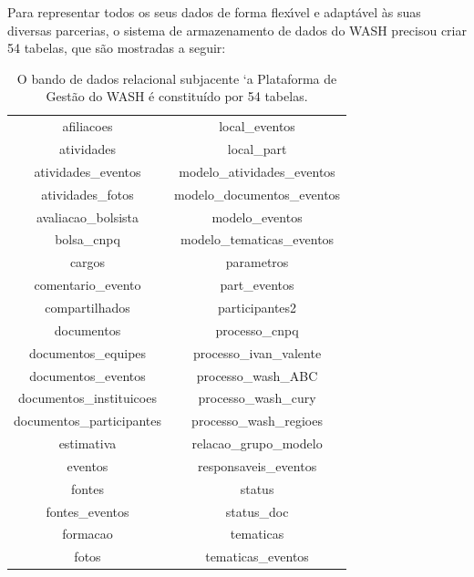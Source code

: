 \documentclass[
12pt,		%
openright,	%
twoside,  %
a4paper,			%
chapter=TITLE,		%
english,			%
french,				%
spanish,			%
brazil				%
]{USPSC-classe/USPSC}
\begin{document}
Para representar todos os seus dados de forma flex\'{\i}vel e adapt\'avel \`as suas diversas parcerias, o sistema de armazenamento de dados do WASH precisou criar 54 tabelas, que s\~ao mostradas a seguir:






\begin{table}[htb]
\tiny
\caption{\label{5b2e4ba8f3836249e7dd88b37344da7bfa3669c5}O bando de dados relacional subjacente `a Plataforma de Gest\~ao do WASH \'e constitu\'{i}do por 54 tabelas.}

\centering
\begin{tabular}{|c|c|}
\hline
afiliacoes                     &   local\_eventos \\
 atividades                     &   local\_part \\
 atividades\_eventos             &   modelo\_atividades\_eventos \\
 atividades\_fotos               &   modelo\_documentos\_eventos \\
 avaliacao\_bolsista             &   modelo\_eventos \\
 bolsa\_cnpq                     &   modelo\_tematicas\_eventos \\
 cargos                         &   parametros \\
 comentario\_evento              &   part\_eventos \\
 compartilhados                 &   participantes2 \\
 documentos                     &   processo\_cnpq \\
 documentos\_equipes             &   processo\_ivan\_valente \\
 documentos\_eventos             &   processo\_wash\_ABC \\
 documentos\_instituicoes        &   processo\_wash\_cury \\
 documentos\_participantes       &   processo\_wash\_regioes \\
 estimativa                     &   relacao\_grupo\_modelo \\
 eventos                        &   responsaveis\_eventos \\
 fontes                         &   status \\
 fontes\_eventos                 &   status\_doc \\
 formacao                       &   tematicas \\
 fotos                          &   tematicas\_eventos \\

\end{tabular}
\end{table}
\end{document}
